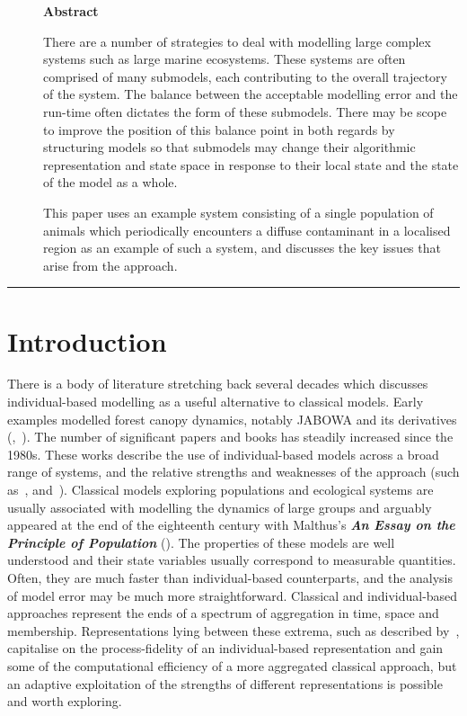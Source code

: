 \begin{description}
  \item[ ]
    \textbf{Abstract}

    There are a number of strategies to deal with modelling large complex
    systems such as large marine ecosystems. These systems are often comprised
    of many submodels, each contributing to the overall trajectory of the
    system. The balance between the acceptable modelling error and the run-time
    often dictates the form of these submodels. There may be scope to improve
    the position of this balance point in both regards by structuring models so
    that submodels may change their algorithmic representation and state space
    in response to their local state and the state of the model as a whole.
  
    This paper uses an example system consisting of a single population of
    animals which periodically encounters a diffuse contaminant in a localised
    region as an example of such a system, and discusses the key issues that
    arise from the approach.
\end{description}

\rule{\textwidth}{2pt}

\section{Introduction}\label{introtwo}

There is a body of literature stretching back several decades which discusses
individual-based modelling as a useful alternative to classical models. Early
examples modelled forest canopy dynamics, notably JABOWA and its derivatives
(\citet{Botkin72:1},~\citet{Botkin72:2}). The number of significant papers and
books has steadily increased since the 1980s. These works describe the use of
individual-based models across a broad range of systems, and the relative
strengths and weaknesses of the approach (such as~\citet{Huston88:1},
\citet{DeAngelis92:1} and~\citet{Grimm05:1}). Classical models exploring
populations and ecological systems are usually associated with modelling the
dynamics of large groups and arguably appeared at the end of the eighteenth
century with Malthus's \textbf{\emph{An Essay on the Principle of
Population\/}} (\citeyear{Malthus:1}). The properties of these models are well
understood and their state variables usually correspond to measurable
quantities. Often, they are much faster than individual-based counterparts,
and the analysis of model error may be much more straightforward. Classical
and individual-based approaches represent the ends of a spectrum of
aggregation in time, space and membership. Representations lying between these
extrema, such as described by~\citet{Scheffer95:1}, capitalise on the
process-fidelity of an individual-based representation and gain some of the
computational efficiency of a more aggregated classical approach, but an
adaptive exploitation of the strengths of different representations is
possible and worth exploring.

